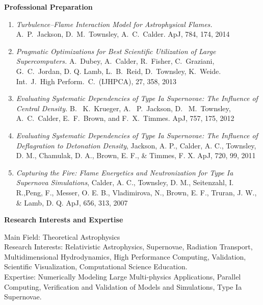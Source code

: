 \documentclass[11pt,letterpaper,english]{article}
\begin{document}
{\begin{flushleft} {\bf Professional Preparation}
\begin{enumerate}
\item
{\em Turbulence--Flame Interaction Model for Astrophysical Flames.}
A.~P.~Jackson, D.~M.~Townsley, A.~C.~Calder. ApJ, 784, 174, 2014 \\

\item
{\em Pragmatic Optimizations for Best Scientific Utilization of
  Large Supercomputers.}
A.~Dubey, A.~Calder, R.~Fisher, C.~Graziani, G.~C.~Jordan,
D. Q. Lamb, L.~B.~Reid, D.~Townsley, K.~Weide.
Int.\ J.\ High Perform.\ C.\ (IJHPCA), 27, 358, 2013 \\

\item
{\em Evaluating Systematic Dependencies of Type Ia Supernovae:
The Influence of Central Density.}
B.~ K.~Krueger, A.~ P.~Jackson, D.~ M.~Townsley, A.~C.~Calder,
E.~F.~Brown, and F.~X.~Timmes. ApJ, 757, 175, 2012 \\

\item
{\emph{Evaluating Systematic Dependencies of Type Ia Supernovae: The Influence of Deflagration to Detonation Density}},
Jackson, A. P., Calder, A. C., Townsley, D. M., Chamulak, D. A.,  Brown, E. F.,  \& Timmes, F. X. ApJ,
720, 99, 2011 \\

\item {\emph{Capturing the Fire: Flame Energetics and Neutronization for Type Ia Supernova Simulations}},
Calder, A. C., Townsley, D. M., Seitenzahl, I. R.,Peng, F., Messer, O. E. B., Vladimirova, N., Brown, E. F., Truran, J. W.,
\& Lamb, D. Q. ApJ, 656, 313, 2007 \\

\end{enumerate} 

\vspace{-6pt}
{\bf Research Interests and Expertise}
{\parindent 16pt

Main Field: Theoretical Astrophysics \\
Research Interests: Relativistic Astrophysics,
Supernovae, Radiation Transport,
Multidimensional Hydrodynamics, High Performance Computing,
Validation, Scientific Visualization, Computational Science
Education.  \\
Expertise: Numerically Modeling Large Multi-physics Applications, Parallel Computing,
Verification and Validation of Models and Simulations, Type Ia Supernovae.

}


\end{flushleft}}
\end{document}
